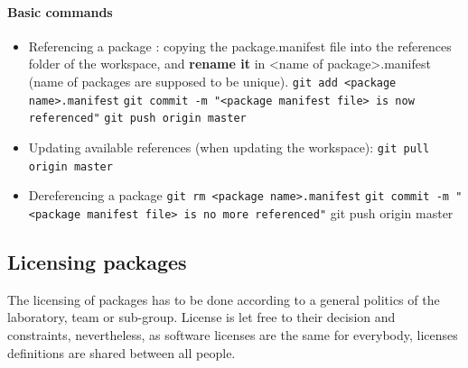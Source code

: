 \documentclass[12pt,a4paper]{article}
\begin{document}
\paragraph{Basic commands}
\begin{itemize}
\item Referencing a package :
\linebreak copying the package.manifest file into the references folder of the workspace, and \textbf{rename it} in <name of package>.manifest (name of packages are supposed to be unique).
\linebreak \texttt{git add <package name>.manifest}
\linebreak \texttt{git commit -m "<package manifest file> is now referenced"}
\linebreak \texttt{git push origin master}
\item Updating available references (when updating the workspace):
\linebreak \texttt{git pull origin master}
\item Dereferencing a package
\linebreak \texttt{git rm <package name>.manifest}
\linebreak \texttt{git commit -m "<package manifest file> is no more referenced"}
\linebreak git push origin master
\end{itemize}

\subsection{Licensing packages}

The licensing of packages has to be done according to a general politics of the laboratory, team or sub-group. License is let free to their decision and constraints, nevertheless, as software licenses are the same for everybody, licenses definitions are shared between all people.
\end{document}
